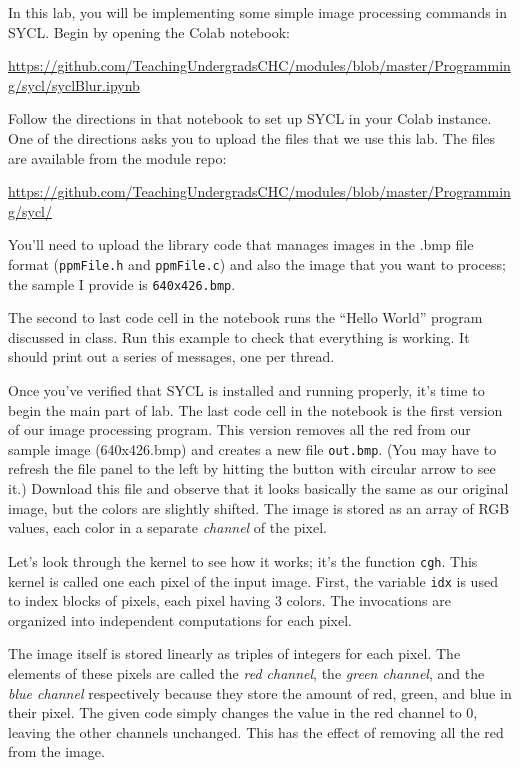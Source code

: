 \documentclass{article}
\begin{document}
In this lab, you will be implementing some simple image processing
commands in SYCL.
Begin by opening the Colab notebook:

{\footnotesize \url{https://github.com/TeachingUndergradsCHC/modules/blob/master/Programming/sycl/syclBlur.ipynb}}

Follow the directions in that notebook to set up SYCL in your Colab
instance.
One of the directions asks you to upload the files that we use this lab.
The files are available from the module repo:

{\footnotesize
  \url{https://github.com/TeachingUndergradsCHC/modules/blob/master/Programming/sycl/}}

You'll need to upload the library code that manages images in the .bmp
file format ({\tt ppmFile.h} and {\tt ppmFile.c}) and also the image
that you want to process; the sample I provide is {\tt 640x426.bmp}.

The second to last code cell in the notebook runs the ``Hello World''
program discussed in class.
Run this example to check that everything is working.
It should print out a series of messages, one per thread.

Once you've verified that SYCL is installed and running properly, it's
time to begin the main part of lab.
The last code cell in the notebook is the first version of our image
processing program.
This version removes all the red from
our sample image (640x426.bmp) and creates a new file
{\tt out.bmp}.
(You may have to refresh the file panel to the left by hitting the
button with circular arrow to see it.)
Download this file and observe that it looks basically the same as our
original image, but the colors are slightly shifted.
The image is stored as an array of RGB values, each color in a
separate {\em channel} of the pixel.

Let's look through the kernel to see how it works; it's the function
{\tt cgh}.
This kernel is called one each pixel of the input image.
First, the variable {\tt idx} is used to index blocks of pixels,
each pixel having 3 colors. The invocations are organized into 
independent computations for each pixel.

The image itself is stored linearly as triples of integers for each
pixel.
The elements of these pixels are called the {\em red channel}, the
{\em green channel}, and the {\em blue channel} respectively because
they store the amount of red, green, and blue in their pixel.
The given code simply changes the value in the red channel to 0,
leaving the other channels unchanged.
This has the effect of removing all the red from the image.
\end{document}
